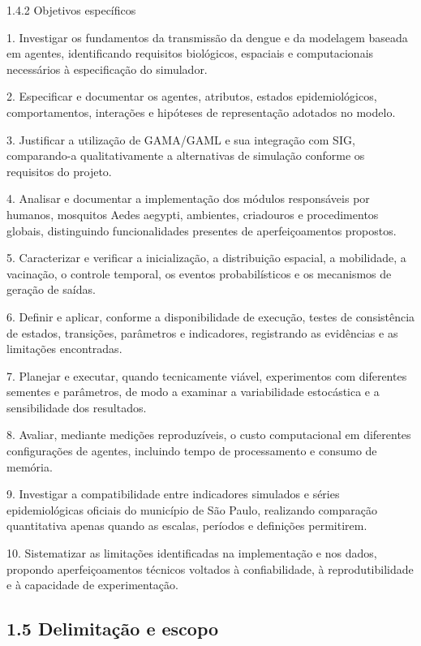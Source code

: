 1.4.2 Objetivos específicos

1. Investigar os fundamentos da transmissão da dengue e da modelagem
baseada em agentes, identificando requisitos biológicos, espaciais e
computacionais necessários à especificação do simulador.

2. Especificar e documentar os agentes, atributos, estados
epidemiológicos, comportamentos, interações e hipóteses de representação
adotados no modelo.

3. Justificar a utilização de GAMA/GAML e sua integração com SIG,
comparando-a qualitativamente a alternativas de simulação conforme os
requisitos do projeto.

4. Analisar e documentar a implementação dos módulos responsáveis por
humanos, mosquitos Aedes aegypti, ambientes, criadouros e procedimentos
globais, distinguindo funcionalidades presentes de aperfeiçoamentos
propostos.

5. Caracterizar e verificar a inicialização, a distribuição espacial, a
mobilidade, a vacinação, o controle temporal, os eventos probabilísticos
e os mecanismos de geração de saídas.

6. Definir e aplicar, conforme a disponibilidade de execução, testes de
consistência de estados, transições, parâmetros e indicadores,
registrando as evidências e as limitações encontradas.

7. Planejar e executar, quando tecnicamente viável, experimentos com
diferentes sementes e parâmetros, de modo a examinar a variabilidade
estocástica e a sensibilidade dos resultados.

8. Avaliar, mediante medições reproduzíveis, o custo computacional em
diferentes configurações de agentes, incluindo tempo de processamento e
consumo de memória.

9. Investigar a compatibilidade entre indicadores simulados e séries
epidemiológicas oficiais do município de São Paulo, realizando
comparação quantitativa apenas quando as escalas, períodos e definições
permitirem.

10. Sistematizar as limitações identificadas na implementação e nos
dados, propondo aperfeiçoamentos técnicos voltados à confiabilidade, à
reprodutibilidade e à capacidade de experimentação.

\subsection{1.5 Delimitação e escopo}\label{delimitauxe7uxe3o-e-escopo}


